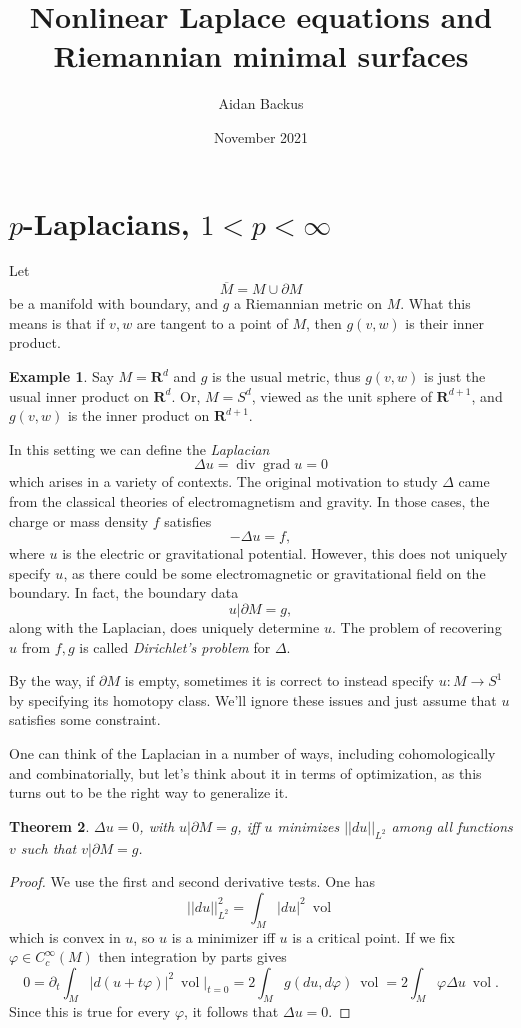 \documentclass[reqno,12pt,letterpaper]{amsart}
\title{Nonlinear Laplace equations and Riemannian minimal surfaces}
\author{Aidan Backus}
\date{November 2021}
\newcommand{\RR}{\mathbf{R}}
\DeclareMathOperator{\Div}{div}
\DeclareMathOperator{\grad}{grad}
\DeclareMathOperator{\vol}{vol}
\newcommand{\dfn}[1]{\emph{#1}\index{#1}}
\newtheorem{theorem}{Theorem}[section]
\theoremstyle{definition}
\newtheorem{example}[theorem]{Example}
\begin{document}
\section{$p$-Laplacians, $1 < p < \infty$}
Let
$$\overline M = M \cup \partial M$$
be a manifold with boundary, and $g$ a Riemannian metric on $M$.
What this means is that if $v, w$ are tangent to a point of $M$, then $g(v, w)$ is their inner product.

\begin{example}
Say $M = \RR^d$ and $g$ is the usual metric, thus $g(v, w)$ is just the usual inner product on $\RR^d$.
Or, $M = S^d$, viewed as the unit sphere of $\RR^{d + 1}$, and $g(v, w)$ is the inner product on $\RR^{d + 1}$.
\end{example}

In this setting we can define the \dfn{Laplacian}
$$\Delta u = \Div \grad u = 0$$
which arises in a variety of contexts.
The original motivation to study $\Delta$ came from the classical theories of electromagnetism and gravity.
In those cases, the charge or mass density $f$ satisfies
$$-\Delta u = f,$$
where $u$ is the electric or gravitational potential. However, this does not uniquely specify $u$, as there could be some electromagnetic or gravitational field on the boundary.
In fact, the boundary data
$$u|\partial M = g,$$
along with the Laplacian, does uniquely determine $u$. The problem of recovering $u$ from $f,g$ is called \dfn{Dirichlet's problem} for $\Delta$.

By the way, if $\partial M$ is empty, sometimes it is correct to instead specify $u: M \to S^1$ by specifying its homotopy class.
We'll ignore these issues and just assume that $u$ satisfies some constraint.

One can think of the Laplacian in a number of ways, including cohomologically and combinatorially, but let's think about it in terms of optimization, as this turns out to be the right way to generalize it.

\begin{theorem}
$\Delta u = 0$, with $u|\partial M = g$, iff $u$ minimizes $||du||_{L^2}$ among all functions $v$ such that $v|\partial M = g$.
\end{theorem}
\begin{proof}
We use the first and second derivative tests. One has
$$||du||_{L^2}^2 = \int_M |du|^2 ~\vol$$
which is convex in $u$, so $u$ is a minimizer iff $u$ is a critical point. If we fix $\varphi \in C^\infty_c(M)$ then integration by parts gives
$$0 = \partial_t \int_M |d(u + t\varphi)|^2 ~\vol|_{t = 0} = 2\int_M g(du, d\varphi) ~\vol = 2 \int_M \varphi \Delta u ~\vol.$$
Since this is true for every $\varphi$, it follows that $\Delta u = 0$.
\end{proof}
\end{document}
